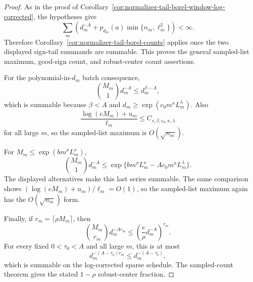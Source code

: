 \documentclass[11pt]{amsart}
\numberwithin{equation}{section}
\theoremstyle{definition}
\theoremstyle{remark}
\begin{document}
\begin{proof}
As in the proof of
Corollary~\ref{cor:normalizer-tail-borel-window-log-corrected}, the hypotheses
give
\[
  \sum_m\left(d_m^{-A}
  +p_{d_m}(a)\min\{n_m,\ell_m^2\}\right)<\infty .
\]
Therefore Corollary~\ref{cor:normalizer-tail-borel-counts} applies once the two
displayed sign-tail summands are summable.  This proves the general sampled-list
maximum, good-sign count, and robust-center count assertions.

For the polynomial-in-\(d_m\) batch consequence,
\[
  \binom{M_m}{1}d_m^{-A}\le d_m^{\beta-A},
\]
which is summable because \(\beta<A\) and
\(d_m\ge\exp(c_0m^\kappa L_m^\lambda)\).  Also
\[
  \frac{\log(eM_m)+u_m}{\ell_m}\le C_{s,\beta,c_0,\kappa,\lambda}
\]
for all large \(m\), so the sampled-list maximum is \(O(\sqrt{n_m})\).

For \(M_m\le\exp(bm^\sigma L_m^\nu)\),
\[
  \binom{M_m}{1}d_m^{-A}
  \le
  \exp\{bm^\sigma L_m^\nu-Ac_0m^\kappa L_m^\lambda\}.
\]
The displayed alternatives make this last series summable.  The same comparison
shows \((\log(eM_m)+u_m)/\ell_m=O(1)\), so the sampled-list maximum again has
the \(O(\sqrt{n_m})\) form.

Finally, if \(r_m=\lceil\rho M_m\rceil\), then
\[
  \binom{M_m}{r_m}d_m^{-A r_m}
  \le
  \left(\frac{e}{\rho}d_m^{-A}\right)^{r_m}.
\]
For every fixed \(0<\tau_0<A\) and all large \(m\), this is at most
\[
  d_m^{-(A-\tau_0)r_m}\le d_m^{-(A-\tau_0)},
\]
which is summable on the log-corrected sparse schedule.  The sampled-count
theorem gives the stated \(1-\rho\) robust-center fraction.
\end{proof}
\end{document}
